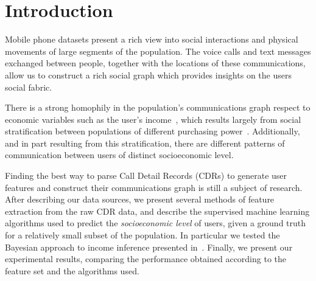 \section{Introduction}

Mobile phone datasets present a rich view into social interactions and physical movements of large segments of the population. 
The voice calls and text messages exchanged between people, together with the locations of these communications, allow us to construct a rich social graph which provides insights on the users social fabric.

There is a strong homophily in the population's communications graph respect to economic variables such as the user's income~\cite{fixmanasonam2016}, which results largely from social stratification between populations of different purchasing power~\cite{leo2015socioeconomic}.
Additionally, and in part resulting from this stratification, there are different patterns of communication between users of distinct socioeconomic level.

Finding the best way to parse Call Detail Records (CDRs) to generate user features and construct their communications graph is still a subject of research.  After describing our data sources, we present several methods of feature extraction from the raw CDR data,
and describe the supervised machine learning algorithms used to predict the \emph{socioeconomic level} of users, given a ground truth for a relatively small subset of the population. In particular we tested the Bayesian approach to income inference presented in~\cite{fixmanasonam2016}. 
Finally, we present our experimental results, comparing the performance obtained according to the feature set and the algorithms used.
